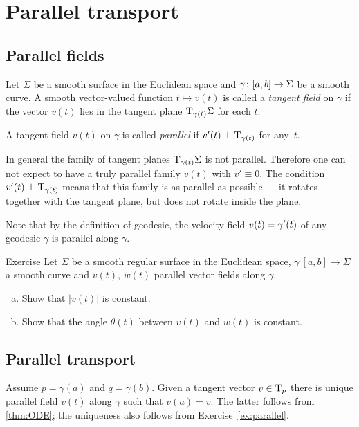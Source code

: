 \chapter{Parallel transport}

\section*{Parallel fields}

Let $\Sigma$ be a smooth surface in the Euclidean space and $\gamma\:[a,b]\z\to \Sigma$ be a smooth curve.
A smooth vector-valued function $t\mapsto v(t)$ is called a \emph{tangent field} on $\gamma$ if
the vector $v(t)$ lies in the tangent plane $\mathrm{T}_{\gamma(t)}\Sigma$ for each $t$.

A tangent field $v(t)$ on $\gamma$ is called \emph{parallel} if $v'(t)\perp\mathrm{T}_{\gamma(t)}$ for any~$t$.

In general the family of tangent planes $\mathrm{T}_{\gamma(t)}\Sigma$ is not parallel.
Therefore one can not expect to have a truly parallel family $v(t)$ with $v'\equiv 0$.
The condition $v'(t)\perp\mathrm{T}_{\gamma(t)}$ means that this family is as parallel as possible --- it rotates together with the tangent plane, but does not rotate inside the plane.

Note that by the definition of geodesic, the velocity field $v(t)\z=\gamma'(t)$ of any geodesic $\gamma$ is parallel along $\gamma$.

\begin{thm}{Exercise}\label{ex:parallel}
Let $\Sigma$ be a smooth regular surface in the Euclidean space, 
$\gamma\:[a,b]\to \Sigma$ a smooth curve 
and $v(t)$, $w(t)$ parallel vector fields along $\gamma$.
\begin{enumerate}[(a)]
 \item Show that $|v(t)|$ is constant.
 \item Show that the angle $\theta(t)$ between $v(t)$ and $w(t)$ is constant.
\end{enumerate}
\end{thm}

\section*{Parallel transport}

Assume $p=\gamma(a)$ and $q=\gamma(b)$.
Given a tangent vector $v\in\mathrm{T}_p$ there is unique parallel field $v(t)$ along $\gamma$ such that $v(a)=v$.
The latter follows from \ref{thm:ODE}; the uniqueness also follows from Exercise~\ref{ex:parallel}.

